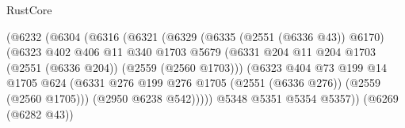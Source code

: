 \begin{lexlean}{RustCore}
\begin{coremodule}
                                              (@6232
                                                (@6304
                                                  (@6316
                                                    (@6321
                                                      (@6329
                                                        (@6335 (@2551 (@6336 @43)) @6170)
                                                        (@6323
                                                          @402
                                                          @406
                                                          @11
                                                          @340
                                                          @1703
                                                          @5679
                                                          (@6331
                                                            @204
                                                            @11
                                                            @204
                                                            @1703
                                                            (@2551 (@6336 @204))
                                                            (@2559 (@2560 @1703)))
                                                          (@6323
                                                            @404
                                                            @73
                                                            @199
                                                            @14
                                                            @1705
                                                            @624
                                                            (@6331
                                                              @276
                                                              @199
                                                              @276
                                                              @1705
                                                              (@2551 (@6336 @276))
                                                              (@2559 (@2560 @1705)))
                                                            (@2950 @6238 @542)))))
                                                    @5348
                                                    @5351
                                                    @5354
                                                    @5357))
                                                (@6269 (@6282 @43))

\end{coremodule}
\end{lexlean}
